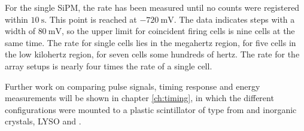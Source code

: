For the single SiPM, the rate has been measured until no counts were registered within $\SI{10}{\second}$. This point is reached at $\SI{-720}{\milli\volt}$. The data indicates steps with a width of $\SI{80}{\milli\volt}$, so the upper limit for coincident firing cells is nine cells at the same time. The rate for single cells lies in the megahertz region, for five cells in the low kilohertz region, for seven cells some hundreds of hertz. The rate for the array setups is nearly four times the rate of a single cell. \par 
Further work on comparing pulse signals, timing response and energy measurements will be shown in chapter \ref{ch:timing}, in which the different configurations were mounted to a plastic scintillator of type  from  and inorganic crystals, LYSO and \pwo{}.









